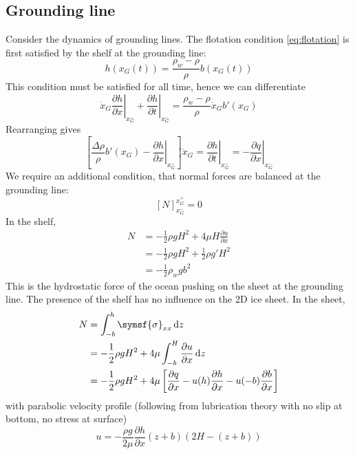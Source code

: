 \documentclass{jknotes}
\begin{document}
\subsection{Grounding line}
Consider the dynamics of grounding lines. The flotation condition
\eqref{eq:flotation} is first satisfied by the shelf at the grounding line:
\begin{equation}
	h(x_G(t)) = \frac{\rho_w - \rho}{\rho} b(x_G(t))
\end{equation}
This condition must be satisfied for all time, hence we can differentiate
\begin{equation}
	\dot{x}_G \left.\frac{\partial h}{\partial x}\right|_{x_G^-} +
	\left.\frac{\partial h}{\partial t}\right|_{x_G^-}
	= \frac{\rho_w - \rho}{\rho} \dot{x}_G b'(x_G)
\end{equation}
Rearranging gives
\begin{equation}
	\left[ \frac{\Delta \rho}{\rho} b'(x_G) - \left.\frac{\partial h}{\partial
	x}\right|_{x_G^-} \right] \dot{x}_G = \left.\frac{\partial h}{\partial
	t}\right|_{x_G^-} = -\left.\frac{\partial q}{\partial x}\right|_{x_G^-}
	\label{eq:l16:1}
\end{equation}
We require an additional condition, that normal forces are balanced at the
grounding line:
\begin{equation}
	\left[ N \right]^{x_G^+}_{x_G^-} = 0
\end{equation}
In the shelf,
\begin{align}
	N &= -\frac{1}{2}\rho g H^2 + 4\mu H \frac{\partial u}{\partial x} \\
	  &= -\frac{1}{2}\rho g H^2 + \frac{1}{2}\rho g' H^2 \\
	  &= -\frac{1}{2}\rho_w g b^2
\end{align}
This is the hydrostatic force of the ocean pushing on the sheet at the
grounding line. The presence of the shelf has no influence on the 2D ice
sheet. In the sheet,
\begin{align}
	N &= \int_{-b}^h \symsf{\sigma}_{xx} \, \diffd z \\
	  &= -\frac{1}{2} \rho g H^2 + 4\mu \int_{-b}^H \frac{\partial u}{\partial
	  x} \, \diffd z \\
	  &= -\frac{1}{2} \rho g H^2 + 4\mu \left[ \frac{\partial q}{\partial x} -
	  u(h)\frac{\partial h}{\partial x} - u(-b)\frac{\partial b}{\partial x}
	  \right] 
\end{align}
with parabolic velocity profile (following from lubrication theory with no
slip at bottom, no stress at surface)
\begin{equation}
	u = -\frac{\rho g}{2\mu} \frac{\partial h}{\partial x}(z+b)(2H-(z+b))
\end{equation}
\end{document}
